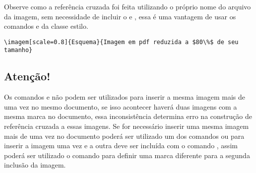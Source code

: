 Observe como a referência cruzada foi feita utilizando o próprio nome do arquivo da imagem, sem necessidade de incluir o  e , essa é uma vantagem de usar os comandos  e  da classe estilo.

\begin{tcolorbox}
\begin{lstlisting}
\imagem[scale=0.8]{Esquema}{Imagem em pdf reduzida a $80\%$ de seu tamanho}
\end{lstlisting}
\end{tcolorbox}


\subsection*{Atenção!}
Os comandos  e  não podem ser utilizados para inserir a mesma imagem 
mais de uma vez no mesmo documento, se isso acontecer haverá duas imagens com a mesma marca no 
documento, essa inconsistência determina erro na construção de referência cruzada a essas imagens. 
Se for necessário inserir uma mesma imagem mais de uma vez no documento poderá ser utilizado um 
dos comandos  ou  para inserir a imagem uma vez e a outra deve ser 
incluída com o comando , assim poderá ser utilizado o comando  
para definir uma marca diferente para a segunda inclusão da imagem.